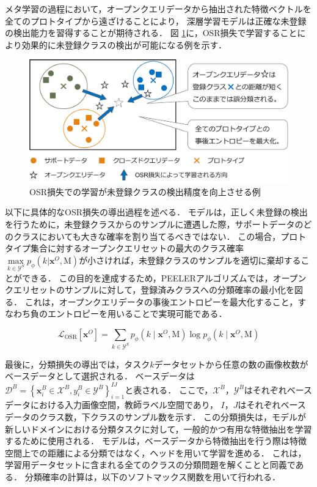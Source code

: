 \documentclass[a4paper,11pt,nomag]{jsreport}
\begin{document}
メタ学習の過程において，オープンクエリデータから抽出された特徴ベクトルを全てのプロトタイプから遠ざけることにより，
深層学習モデルは正確な未登録の検出能力を習得することが期待される．
図 \ref{fig:osr_loss}に，OSR損失で学習することにより効果的に未登録クラスの検出が可能になる例を示す．

\begin{figure}[tbp]
  \centering
  \includegraphics[width=\linewidth, keepaspectratio]{image/osr_loss.png}
  \caption{OSR損失での学習が未登録クラスの検出精度を向上させる例}
  \label{fig:osr_loss}
\end{figure}

以下に具体的なOSR損失の導出過程を述べる．
モデルは，正しく未登録の検出を行うために，未登録クラスからのサンプルに遭遇した際，サポートデータのどのクラスにおいても大きな確率を割り当てるべきではない．
この場合，プロトタイプ集合に対するオープンクエリセットの最大のクラス確率$\underset{k \in \mathcal{Y}^S}{\max} {p_{\phi}(k|\bm{x}^O, \mathrm{M})}$が小さければ，未登録クラスのサンプルを適切に棄却することができる．
この目的を達成するため，PEELERアルゴリズムでは，オープンクエリセットのサンプルに対して，登録済みクラスへの分類確率の最小化を図る．
これは，オープンクエリデータの事後エントロピーを最大化すること，すなわち負のエントロピーを用いることで実現可能である．

\begin{equation}
    \mathcal{L}_{\mathrm{OSR}}[\bm{x}^O]
                = \sum_{k \in \mathcal{Y}^S} {p_{\phi}(k \mid \bm{x}^O, \mathrm{M}) \log{p_{\phi}(k \mid \bm{x}^O, \mathrm{M})}}
\end{equation}

最後に，分類損失の導出では，タスク$k$データセットから任意の数の画像枚数がベースデータとして選択される．
ベースデータは$\mathcal{D}^B = \left\{ \bm{x}^B_i \in \mathcal{X}^B, y^B_i \in \mathcal{Y}^B \right\}^{I J}_{i=1}$と表される．
ここで，$\mathcal{X}^B$，$\mathcal{Y}^B$はそれぞれベースデータにおける入力画像空間，教師ラベル空間であり，
$I$，$J$はそれぞれベースデータのクラス数，下クラスのサンプル数を示す．
この分類損失は，モデルが新しいドメインにおける分類タスクに対して，一般的かつ有用な特徴抽出を学習するために使用される．
モデルは，ベースデータから特徴抽出を行う際は特徴空間上での距離による分類ではなく，ヘッドを用いて学習を進める．
これは，学習用データセットに含まれる全てのクラスの分類問題を解くことと同義である．
分類確率の計算は，以下のソフトマックス関数を用いて行われる．
\end{document}
